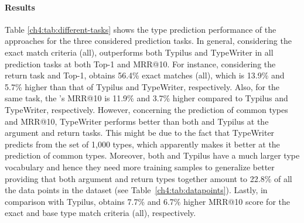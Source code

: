 \paragraph{Results}
Table \ref{ch4:tab:different-tasks} shows the type prediction performance of the approaches for the three considered prediction tasks. In general, considering the exact match criteria (all), \name outperforms both Typilus and TypeWriter in all prediction tasks at both Top-1 and MRR@10. For instance, considering the return task and Top-1, \name obtains 56.4\% exact matches (all), which is 13.9\% and 5.7\% higher than that of Typilus and TypeWriter, respectively. Also, for the same task, the \name's MRR@10 is 11.9\% and 3.7\% higher compared to Typilus and TypeWriter, respectively. However, concerning the prediction of common types and MRR@10, TypeWriter performs better than both \name and Typilus at the argument and return tasks. This might be due to the fact that TypeWriter predicts from the set of 1,000 types, which apparently makes it better at the prediction of common types. Moreover, both \name and Typilus have a much larger type vocabulary and hence they need more training samples to generalize better providing that both argument and return types together amount to 22.8\% of all the data points in the dataset (see Table~\ref{ch4:tab:datapoints}). Lastly, in comparison with Typilus, \name obtains 7.7\% and 6.7\% higher MRR@10 score for the exact and base type match criteria (all), respectively.


